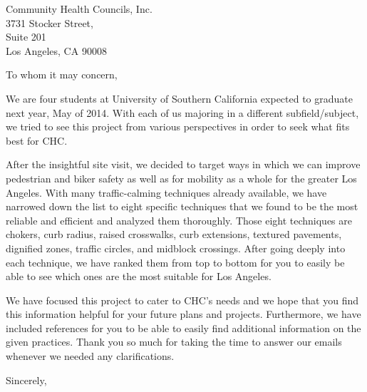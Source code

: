 \documentclass{letter}
\date{6\textsuperscript{th} December 2013}
\begin{document}
\begin{letter}{Community Health Councils, Inc.\\3731 Stocker Street,\\ Suite 201\\ Los Angeles, CA 90008}
\opening{To whom it may concern,}

We are four students at University of Southern California expected to graduate next year, May of 2014. With each of us majoring in a different subfield/subject, we tried to see this project from various perspectives in order to seek what fits best for CHC. 

After the insightful site visit, we decided to target ways in which we can improve pedestrian and biker safety as well as for mobility as a whole for the greater Los Angeles. With many traffic-calming techniques already available, we have narrowed down the list to eight specific techniques that we found to be the most reliable and efficient and analyzed them thoroughly. Those eight techniques are chokers, curb radius, raised crosswalks, curb extensions, textured pavements, dignified zones, traffic circles, and midblock crossings. After going deeply into each technique, we have ranked them from top to bottom for you to easily be able to see which ones are the most suitable for Los Angeles. 

We have focused this project to cater to CHC’s needs and we hope that you find this information helpful for your future plans and projects. Furthermore, we have included references for you to be able to easily find additional information on the given practices. Thank you so much for taking the time to answer our emails whenever we needed any clarifications.

\closing{Sincerely,}
\end{letter}
\end{document}
